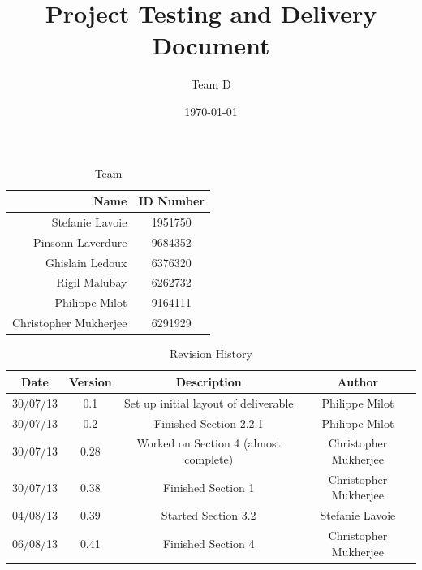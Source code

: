 \documentclass{article}
\begin{document}
\title{Project Testing and Delivery Document}
\author{Team D}
\date{\today}

\maketitle

\vspace*{3.5in}
\begin{table}[htbp]
\caption{Team}
\begin{center}
\begin{tabular}{|r | c|}
\hline
Name & ID Number \\
\hline\hline
Stefanie Lavoie & 1951750 \\
Pinsonn Laverdure & 9684352 \\
Ghislain Ledoux & 6376320 \\
Rigil Malubay & 6262732 \\
Philippe Milot & 9164111 \\
Christopher Mukherjee & 6291929 \\
\hline
\end{tabular}
\end{center}
\end{table}

\clearpage

\begin{table}[htbp]
\caption{Revision History}
\begin{center}
\begin{tabular}{|c | c | c | c| }
\hline
Date & Version & Description & Author \\
\hline\hline
30/07/13 & 0.1 & Set up initial layout of deliverable & Philippe Milot \\
\hline
30/07/13 & 0.2 & Finished Section 2.2.1 & Philippe Milot \\
\hline
30/07/13 & 0.28 & Worked on Section 4 (almost complete) & Christopher Mukherjee \\
\hline
30/07/13 & 0.38 & Finished Section 1 & Christopher Mukherjee \\
\hline
04/08/13 & 0.39 & Started Section 3.2 & Stefanie Lavoie \\
\hline
06/08/13 & 0.41 & Finished Section 4 & Christopher Mukherjee \\
\hline
\end{tabular}
\end{center}
\end{table}
\end{document}
